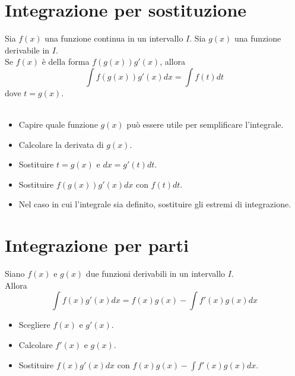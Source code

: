 \documentclass{article}
\begin{document}
\section*{Integrazione per sostituzione}
Sia $f(x)$ una funzione continua in un intervallo $I$. Sia $g(x)$ una funzione derivabile in $I$.\\
Se $f(x)$ è della forma $f(g(x))g'(x)$, allora
\begin{equation*}
    \int f(g(x))g'(x)dx = \int f(t)dt
\end{equation*}
dove $t=g(x)$.\\\\
\begin{itemize}
    \item Capire quale funzione $g(x)$ può essere utile per semplificare l'integrale.
    \item Calcolare la derivata di $g(x)$.
    \item Sostituire $t=g(x)$ e $dx=g'(t)dt$.
    \item Sostituire $f(g(x))g'(x)dx$ con $f(t)dt$.
    \item Nel caso in cui l'integrale sia definito, sostituire gli estremi di integrazione.
\end{itemize}
\section*{Integrazione per parti}
Siano $f(x)$ e $g(x)$ due funzioni derivabili in un intervallo $I$.\\
Allora
\begin{equation*}
    \int f(x)g'(x)dx = f(x)g(x) - \int f'(x)g(x)dx
\end{equation*}
\begin{itemize}
    \item Scegliere $f(x)$ e $g'(x)$.
    \item Calcolare $f'(x)$ e $g(x)$.
    \item Sostituire $f(x)g'(x)dx$ con $f(x)g(x)-\int f'(x)g(x)dx$.\\\\
\end{itemize}
\end{document}
